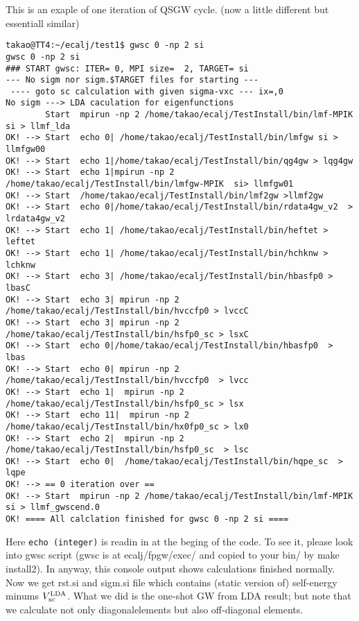 \documentclass[a4paper,10pt,epsf,fleqn]{article}
\begin{document}
This is an exaple of one iteration of QSGW cycle.
(now a little different but essentiall similar)
\begin{verbatim}
takao@TT4:~/ecalj/test1$ gwsc 0 -np 2 si
gwsc 0 -np 2 si
### START gwsc: ITER= 0, MPI size=  2, TARGET= si
--- No sigm nor sigm.$TARGET files for starting ---
 ---- goto sc calculation with given sigma-vxc --- ix=,0
No sigm ---> LDA caculation for eigenfunctions 
        Start  mpirun -np 2 /home/takao/ecalj/TestInstall/bin/lmf-MPIK  si > llmf_lda 
OK! --> Start  echo 0| /home/takao/ecalj/TestInstall/bin/lmfgw si > llmfgw00 
OK! --> Start  echo 1|/home/takao/ecalj/TestInstall/bin/qg4gw > lqg4gw 
OK! --> Start  echo 1|mpirun -np 2 /home/takao/ecalj/TestInstall/bin/lmfgw-MPIK  si> llmfgw01 
OK! --> Start  /home/takao/ecalj/TestInstall/bin/lmf2gw >llmf2gw
OK! --> Start  echo 0|/home/takao/ecalj/TestInstall/bin/rdata4gw_v2  > lrdata4gw_v2 
OK! --> Start  echo 1| /home/takao/ecalj/TestInstall/bin/heftet > leftet 
OK! --> Start  echo 1| /home/takao/ecalj/TestInstall/bin/hchknw > lchknw 
OK! --> Start  echo 3| /home/takao/ecalj/TestInstall/bin/hbasfp0 > lbasC 
OK! --> Start  echo 3| mpirun -np 2 /home/takao/ecalj/TestInstall/bin/hvccfp0 > lvccC 
OK! --> Start  echo 3| mpirun -np 2 /home/takao/ecalj/TestInstall/bin/hsfp0_sc > lsxC 
OK! --> Start  echo 0|/home/takao/ecalj/TestInstall/bin/hbasfp0  > lbas 
OK! --> Start  echo 0| mpirun -np 2 /home/takao/ecalj/TestInstall/bin/hvccfp0  > lvcc 
OK! --> Start  echo 1|  mpirun -np 2 /home/takao/ecalj/TestInstall/bin/hsfp0_sc > lsx 
OK! --> Start  echo 11|  mpirun -np 2 /home/takao/ecalj/TestInstall/bin/hx0fp0_sc > lx0 
OK! --> Start  echo 2|  mpirun -np 2 /home/takao/ecalj/TestInstall/bin/hsfp0_sc  > lsc 
OK! --> Start  echo 0|  /home/takao/ecalj/TestInstall/bin/hqpe_sc  > lqpe 
OK! --> == 0 iteration over ==
OK! --> Start  mpirun -np 2 /home/takao/ecalj/TestInstall/bin/lmf-MPIK  si > llmf_gwscend.0 
OK! ==== All calclation finished for gwsc 0 -np 2 si ====
\end{verbatim}
Here \verb+echo (integer)+ is readin in at the beging of the code.
To see it, please look into gwsc script (gwsc is at
ecalj/fpgw/exec/ and copied to your bin/ by make install2). 
In anyway, this console output shows calculations finished normally.\\

Now we get rst.si and sigm.si file which contains (static version of) self-energy
minums $V_{\rm xc}^{\rm LDA}$.
What we did is the one-shot GW from LDA result; but note that we
calculate not only diagonalelements but also off-diagonal elements. 
\end{document}
